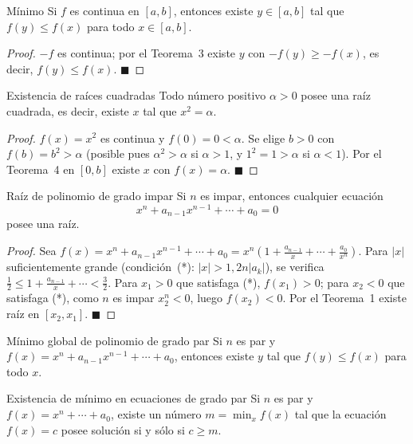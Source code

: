 \documentclass[12pt]{article}
\begin{document}
\begin{teorema}[7]{Mínimo}
Si $f$ es continua en $[a, b]$, entonces existe $y \in [a, b]$ tal que $f(y) \leq f(x)$ para todo $x \in [a, b]$.
\end{teorema}

\begin{proof}
$-f$ es continua; por el Teorema~3 existe $y$ con $-f(y) \geq -f(x)$, es decir, $f(y) \leq f(x)$.
$\blacksquare$
\end{proof}

\begin{teorema}[8]{Existencia de raíces cuadradas}
Todo número positivo $\alpha > 0$ posee una raíz cuadrada, es decir, existe $x$ tal que $x^2 = \alpha$.
\end{teorema}

\begin{proof}
$f(x) = x^2$ es continua y $f(0) = 0 < \alpha$. Se elige $b > 0$ con $f(b) = b^2 > \alpha$ (posible pues $\alpha^2 > \alpha$ si $\alpha > 1$, y $1^2 = 1 > \alpha$ si $\alpha < 1$). Por el Teorema~4 en $[0, b]$ existe $x$ con $f(x) = \alpha$.
$\blacksquare$
\end{proof}

\begin{teorema}[9]{Raíz de polinomio de grado impar}
Si $n$ es impar, entonces cualquier ecuación
\[ x^n + a_{n-1}x^{n-1} + \cdots + a_0 = 0 \]
posee una raíz.
\end{teorema}

\begin{proof}
Sea $f(x) = x^n + a_{n-1}x^{n-1} + \cdots + a_0 = x^n\!\left(1 + \tfrac{a_{n-1}}{x} + \cdots + \tfrac{a_0}{x^n}\right)$.
Para $|x|$ suficientemente grande (condición~(*): $|x| > 1, 2n|a_k|$), se verifica $\tfrac{1}{2} \leq 1 + \tfrac{a_{n-1}}{x} + \cdots < \tfrac{3}{2}$. Para $x_1 > 0$ que satisfaga (*), $f(x_1) > 0$; para $x_2 < 0$ que satisfaga (*), como $n$ es impar $x_2^n < 0$, luego $f(x_2) < 0$. Por el Teorema~1 existe raíz en $[x_2, x_1]$.
$\blacksquare$
\end{proof}

\begin{teorema}[10]{Mínimo global de polinomio de grado par}
Si $n$ es par y $f(x) = x^n + a_{n-1}x^{n-1} + \cdots + a_0$, entonces existe $y$ tal que $f(y) \leq f(x)$ para todo $x$.
\end{teorema}

\begin{teorema}[11]{Existencia de mínimo en ecuaciones de grado par}
Si $n$ es par y $f(x) = x^n + \cdots + a_0$, existe un número $m = \min_x f(x)$ tal que la ecuación $f(x) = c$ posee solución si y sólo si $c \geq m$.
\end{teorema}
\end{document}
